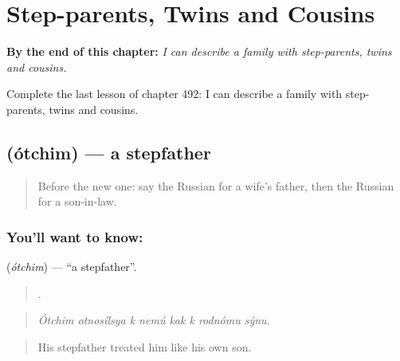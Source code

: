 
\chapter{Step-parents, Twins and Cousins}
\label{ch:ru-step-parents-twins-and-cousins}

\begin{chapteropening}
\textbf{By the end of this chapter:} \emph{I can describe a family with step-parents, twins and cousins.}

Complete the last lesson of chapter 492: I can describe a family with step-parents, twins and cousins.
\end{chapteropening}

\section[\texorpdfstring{\ru{отчим} (ótchim)}{отчим (ótchim)}]{ (ótchim) — a stepfather}

\label{lesson:RU-C492-otchim}



\begin{quote}
Before the new one: say the Russian for a wife's father, then the Russian for a son-in-law.
\end{quote}

\subsection*{You'll want to know: }
\textbf{} (\emph{ótchim}) — \textquotedblleft{}a stepfather\textquotedblright{}.

\begin{quote}
       .
\end{quote}

\begin{quote}
\emph{Ótchim otnosílsya k nemú kak k rodnómu sýnu.}
\end{quote}

\begin{quote}
His stepfather treated him like his own son.
\end{quote}

